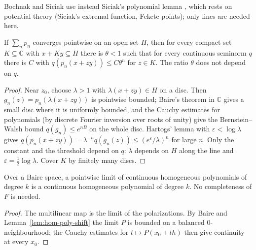 Bochnak and Siciak use instead Siciak's polynomial lemma \cite[\S4]{BS71b}, which rests on
potential theory (Siciak's extremal function, Fekete points); only lines are needed here.

\begin{proposition}
  \label{prop:bs-lines}
  \leanok
  If $\sum_n p_n$ converges pointwise on an open set $H$, then for every compact set
  $K \subseteq \mathbb{C}$ with $x + K y \subseteq H$ there is $\theta < 1$ such that for every
  continuous seminorm $q$ there is $C$ with $q(p_n(x + z y)) \le C \theta^n$ for $z \in K$. The
  ratio $\theta$ does not depend on $q$.
\end{proposition}

\begin{proof}
  \leanok
  Near $z_0$, choose $\lambda > 1$ with $\lambda(x + z y) \in H$ on a disc. Then
  $g_n(z) = p_n(\lambda(x + zy))$ is pointwise bounded; Baire's theorem in $\mathbb{C}$ gives a
  small disc where it is uniformly bounded, and the Cauchy estimates for polynomials (by discrete
  Fourier inversion over roots of unity) give the Bernstein--Walsh bound
  $q(g_n) \le e^{nB}$ on the whole disc. Hartogs' lemma with $\varepsilon < \log \lambda$ gives
  $q(p_n(x + zy)) = \lambda^{-n} q(g_n(z)) \le (e^{\varepsilon}/\lambda)^n$ for large $n$.
  Only the constant and the threshold depend on $q$: $\lambda$ depends on $H$ along the line and
  $\varepsilon = \tfrac12 \log \lambda$. Cover $K$ by finitely many discs.
\end{proof}

\begin{theorem}
  \label{thm:bs-limits}
  \leanok
  Over a Baire space, a pointwise limit of continuous homogeneous polynomials of degree $k$ is a
  continuous homogeneous polynomial of degree $k$. No completeness of $F$ is needed.
\end{theorem}

\begin{proof}
  \leanok
  The multilinear map is the limit of the polarizations. By Baire and
  Lemma~\ref{lem:hom-poly-shift} the limit $P$ is bounded on a balanced $0$-neighbourhood; the
  Cauchy estimates for $t \mapsto P(x_0 + t h)$ then give continuity at every $x_0$.
\end{proof}

